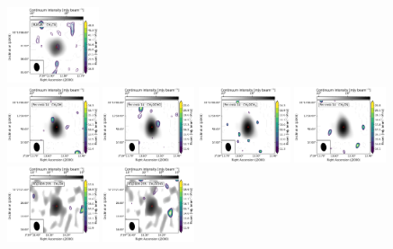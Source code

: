 \begin{figure}[htbp!]
  \includegraphics[width=0.24\textwidth]{./moment0/Set2_ID02_2_CH3CN_257527.pdf}
  \\
  \includegraphics[width=0.24\textwidth]{./moment0/Set2_ID06_CH3OH_243915.pdf}
  \includegraphics[width=0.24\textwidth]{./moment0/Set2_ID06_CH3OCHO_259342.pdf}
  \includegraphics[width=0.24\textwidth]{./moment0/Set2_ID06_CH3OCH3_259311.pdf}
  \includegraphics[width=0.24\textwidth]{./moment0/Set2_ID06_CH3CN_257527.pdf}
  \\
  \includegraphics[width=0.24\textwidth]{./moment0/Set2_ID13_2_CH3OH_243915.pdf}
  \includegraphics[width=0.24\textwidth]{./moment0/Set2_ID13_2_CH3OCHO_259342.pdf}

\end{figure}

